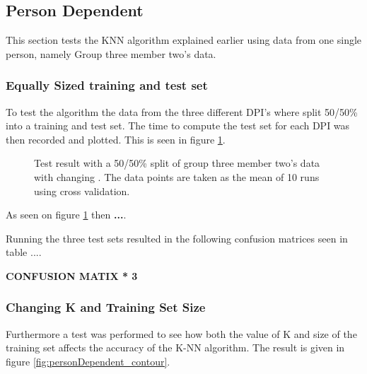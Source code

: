 
\subsection{Person Dependent}
This section tests the KNN algorithm explained earlier using data from one single person, namely Group three member two's data.
%
%
%
%

\subsubsection{Equally Sized training and test set}
To test the algorithm the data from the three different DPI's where split 50/50\% into a training and test set. The time to compute the test set for each DPI was then recorded and plotted. This is seen in figure \ref{fig:PersonDependent_5050}.

\begin{figure}[H]
\centering
\caption{Test result with a 50/50\% split of group three member two's data with changing . The data points are taken as the mean of 10 runs using cross validation.}
\label{fig:PersonDependent_5050}
\end{figure}

As seen on figure \ref{fig:PersonDependent_5050} then \textbf{...}.

Running the three test sets resulted in the following confusion matrices seen in table ....

\textbf{CONFUSION MATIX * 3}




\subsubsection{Changing K and Training Set Size}
Furthermore a test was performed to see how both the value of K and size of the training set affects the accuracy of the K-NN algorithm. The result is given in figure \ref{fig:personDependent_contour}.

